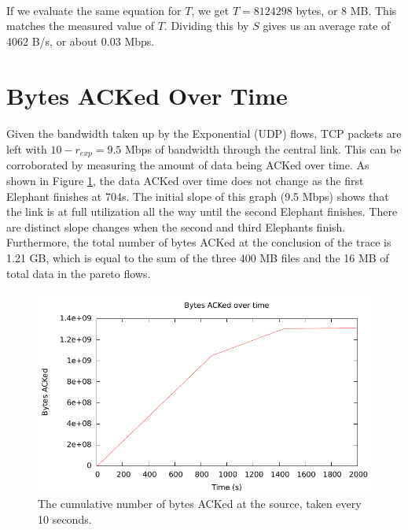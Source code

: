 \documentclass{article}
\begin{document}
    \paragraph{}
      If we evaluate the same equation for $T$, we get $T = 8124298$ bytes, or 8 MB. This matches the measured value of $T$.
      Dividing this by $S$ gives us an average rate of 4062 B/s, or about 0.03 Mbps.

  \section{Bytes ACKed Over Time}
    \paragraph{}
      Given the bandwidth taken up by the Exponential (UDP) flows, TCP packets are left with $10 - r_{exp} = 9.5$ Mbps of bandwidth through the central link.
      This can be corroborated by measuring the amount of data being ACKed over time.
      As shown in Figure \ref{fig:ack_plot}, the data ACKed over time does not change as the first Elephant finishes at 704s.
      The initial slope of this graph (9.5 Mbps) shows that the link is at full utilization all the way until the second Elephant finishes.
      There are distinct slope changes when the second and third Elephants finish.
      Furthermore, the total number of bytes ACKed at the conclusion of the trace is 1.21 GB, which is equal to the sum of the three 400 MB files and the 16 MB of total data in the pareto flows.

    \begin{figure}[h]
      \begin{centering}
        \includegraphics{ack_plot}
        \caption{The cumulative number of bytes ACKed at the source, taken every 10 seconds.}
        \label{fig:ack_plot}
      \end{centering}
    \end{figure}
\end{document}
